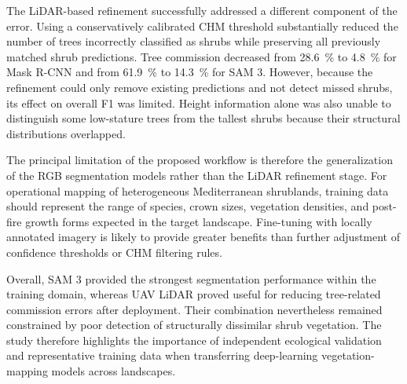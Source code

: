 \documentclass[12pt,a4paper]{article}
\begin{document}
The LiDAR-based refinement successfully addressed a different component of the error. Using a conservatively calibrated CHM threshold substantially reduced the number of trees incorrectly classified as shrubs while preserving all previously matched shrub predictions. Tree commission decreased from \qty{28.6}{\percent} to \qty{4.8}{\percent} for Mask R-CNN and from \qty{61.9}{\percent} to \qty{14.3}{\percent} for SAM 3. However, because the refinement could only remove existing predictions and not detect missed shrubs, its effect on overall F1 was limited. Height information alone was also unable to distinguish some low-stature trees from the tallest shrubs because their structural distributions overlapped.

The principal limitation of the proposed workflow is therefore the generalization of the RGB segmentation models rather than the LiDAR refinement stage. For operational mapping of heterogeneous Mediterranean shrublands, training data should represent the range of species, crown sizes, vegetation densities, and post-fire growth forms expected in the target landscape. Fine-tuning with locally annotated imagery is likely to provide greater benefits than further adjustment of confidence thresholds or CHM filtering rules.

Overall, SAM 3 provided the strongest segmentation performance within the training domain, whereas UAV LiDAR proved useful for reducing tree-related commission errors after deployment. Their combination nevertheless remained constrained by poor detection of structurally dissimilar shrub vegetation. The study therefore highlights the importance of independent ecological validation and representative training data when transferring deep-learning vegetation-mapping models across landscapes.





\end{document}
